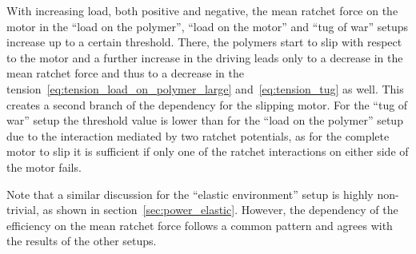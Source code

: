 \documentclass[aps,pre,twocolumn,showpacs,showkeys,superscriptaddress,floatfix]{revtex4-1}
\begin{document}
With increasing load, both positive and negative, the mean ratchet force on the motor in the ``load on the polymer'', ``load on the motor'' and ``tug of war'' setups increase up to a certain threshold.
There, the polymers start to slip with respect to the motor and a further increase in the driving leads only to a decrease in the mean ratchet force and thus to a decrease in the tension~\eqref{eq:tension_load_on_polymer_large} and~\eqref{eq:tension_tug} as well.
This creates a second branch of the dependency for the slipping motor. 
For the ``tug of war'' setup the threshold value is lower than for the ``load on the polymer'' setup due to the interaction mediated by two ratchet potentials, 
as for the complete motor to slip it is sufficient if only one of the ratchet interactions on either side of the motor fails. 

Note that a similar discussion for the ``elastic environment'' setup is highly non-trivial, as shown in section~\ref{sec:power_elastic}.
However, the dependency of the efficiency on the mean ratchet force follows a common pattern and agrees with the results of the other setups. 
\end{document}
